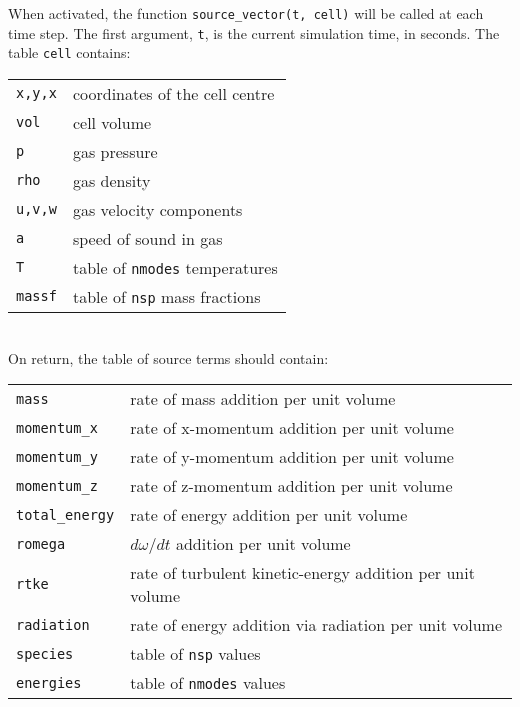 \bigskip
When activated, the function \texttt{source\_vector(t, cell)} will be called at each time step.
The first argument, \texttt{t}, is the current simulation time, in seconds.
The table \texttt{cell} contains:\\
\begin{tabular}{ll}
 \texttt{x,y,x} & coordinates of the cell centre \\
 \texttt{vol} & cell volume \\
 \texttt{p} & gas pressure \\
 \texttt{rho} & gas density \\
 \texttt{u,v,w} & gas velocity components \\
 \texttt{a} & speed of sound in gas \\
 \texttt{T} & table of \texttt{nmodes} temperatures \\
 \texttt{massf} & table of \texttt{nsp} mass fractions \\
\end{tabular}\\
On return, the table of source terms should contain:\\
\begin{tabular}{ll}
 \texttt{mass} &  rate of mass addition per unit volume\\
 \texttt{momentum\_x} & rate of x-momentum addition per unit volume\\
 \texttt{momentum\_y} & rate of y-momentum addition per unit volume\\
 \texttt{momentum\_z} & rate of z-momentum addition per unit volume\\
 \texttt{total\_energy} & rate of energy addition per unit volume\\
 \texttt{romega} & $d\omega/dt$ addition per unit volume\\
 \texttt{rtke} & rate of turbulent kinetic-energy addition per unit volume\\
 \texttt{radiation} & rate of energy addition via radiation per unit volume\\
 \texttt{species} & table of \texttt{nsp} values\\
 \texttt{energies} & table of \texttt{nmodes} values\\
\end{tabular}\\

